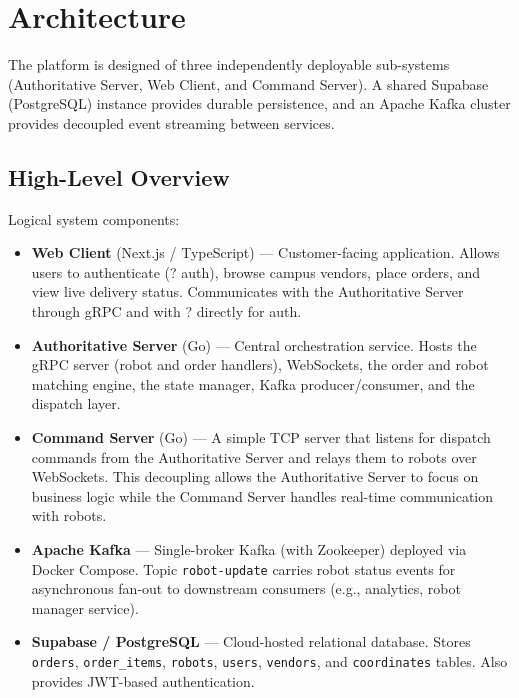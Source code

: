 \documentclass[12pt,a4paper]{article}
\begin{document}
\section{Architecture}
The platform is designed of three independently deployable sub-systems (Authoritative Server, Web Client, and Command Server). A shared Supabase (PostgreSQL) instance provides durable persistence, and an Apache Kafka cluster provides decoupled event streaming between services.

\subsection{High-Level Overview }
Logical system components:
\begin{itemize}
  \item \textbf{Web Client} (Next.js / TypeScript) --- Customer-facing application. Allows users to authenticate (? auth), browse campus vendors, place orders, and view live delivery status. Communicates with the Authoritative Server through gRPC and with ? directly for auth.
  \item \textbf{Authoritative Server} (Go) --- Central orchestration service. Hosts the gRPC server (robot and order handlers), WebSockets, the order and robot matching engine, the state manager, Kafka producer/consumer, and the dispatch layer.
  \item \textbf{Command Server} (Go) --- A simple TCP server that listens for dispatch commands from the Authoritative Server and relays them to robots over WebSockets. This decoupling allows the Authoritative Server to focus on business logic while the Command Server handles real-time communication with robots.
  \item \textbf{Apache Kafka} --- Single-broker Kafka (with Zookeeper) deployed via Docker Compose. Topic \texttt{robot-update} carries robot status events for asynchronous fan-out to downstream consumers (e.g., analytics, robot manager service).
  \item \textbf{Supabase / PostgreSQL} --- Cloud-hosted relational database. Stores \texttt{orders}, \texttt{order\_items}, \texttt{robots}, \texttt{users}, \texttt{vendors}, and \texttt{coordinates} tables. Also provides JWT-based authentication.
\end{itemize}
\end{document}
